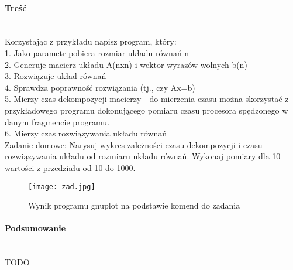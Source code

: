 \paragraph{Treść}~\\
Korzystając z przykładu napisz program, który:\\
1. Jako parametr pobiera rozmiar układu równań n\\
2. Generuje macierz układu A(nxn) i wektor wyrazów wolnych b(n)\\
3. Rozwiązuje układ równań\\
4. Sprawdza poprawność rozwiązania (tj., czy Ax=b)\\
5. Mierzy czas dekompozycji macierzy - do mierzenia czasu można skorzystać z przykładowego programu dokonującego pomiaru czasu procesora spędzonego w danym fragmencie programu.\\
6. Mierzy czas rozwiązywania układu równań\\
Zadanie domowe: Narysuj wykres zależności czasu dekompozycji i czasu rozwiązywania układu od rozmiaru układu równań. Wykonaj pomiary dla 10 wartości z przedziału od 10 do 1000.





\begin{figure}[p]
  \caption{Wynik programu gnuplot na podstawie komend do zadania}
  \label{fig:ZadJpg}
  \centering
  \texttt{[image: zad.jpg]}
\end{figure}

\paragraph{Podsumowanie}~\\
TODO
